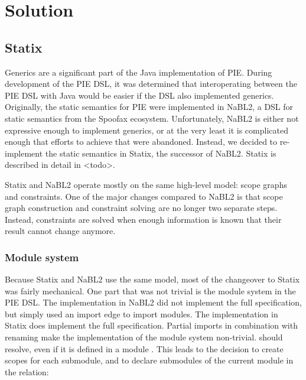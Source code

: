 \chapter{\label{chap:solution}Solution}


\section{\label{sec:solution__statix}Statix}
Generics are a significant part of the Java implementation of \ac{PIE}.
During development of the \ac{PIE} \ac{DSL}, it was determined that interoperating between the \ac{PIE} \ac{DSL} with Java would be easier if the \ac{DSL} also implemented generics.
Originally, the static semantics for \ac{PIE} were implemented in NaBL2, a \ac{DSL} for static semantics from the Spoofax ecosystem.
Unfortunately, \ac{NaBL2} is either not expressive enough to implement generics, or at the very least it is complicated enough that efforts to achieve that were abandoned. 
Instead, we decided to re-implement  the static semantics in Statix, the successor of \ac{NaBL2}.
Statix is described in detail in <todo>.

Statix and \ac{NaBL2} operate mostly on the same high-level model: scope graphs and constraints.
One of the major changes compared to \ac{NaBL2} is that scope graph construction and constraint solving are no longer two separate steps.
Instead, constraints are solved when enough information is known that their result cannot change anymore.

\subsection{\label{subsec:solution__statix__module_system}Module system}
Because Statix and \ac{NaBL2} use the same model, most of the changeover to Statix was fairly mechanical.
One part that was not trivial is the module system in the \ac{PIE} \ac{DSL}.
The implementation in \ac{NaBL2} did not implement the full specification, but simply used an import edge to import modules. 
The implementation in Statix does implement the full specification.
Partial imports  in combination with renaming make the implementation of the module system non-trivial.
 should resolve, even if it is defined in a module .
This leads to the decision to create scopes for each submodule, and to declare submodules of the current module in the  relation:


